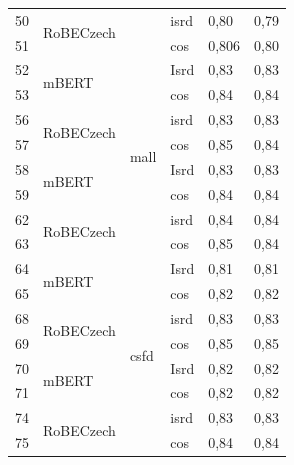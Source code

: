 \begin{table}[]
{\begin{tabular}{|l|l|l|l||ll|}
50 & \multirow{2}{*}{RoBECzech} &                           & isrd                  & 0,80   & 0,79 \\ \cline{1-1} \cline{4-6} 
51 &                            &                           & cos                   & 0,806  & 0,80 \\ \hline
52 & \multirow{2}{*}{mBERT}     & \multirow{8}{*}{mall}     & Isrd                  & 0,83   & 0,83 \\ \cline{1-1} \cline{4-6} 
53 &                            &                           & cos                   & 0,84   & 0,84 \\ \cline{1-2} \cline{4-6} 
56 & \multirow{2}{*}{RoBECzech} &                           & isrd                  & 0,83   & 0,83 \\ \cline{1-1} \cline{4-6} 
57 &                            &                           & cos                   & 0,85   & 0,84 \\ \cline{1-2} \cline{4-6} 
58 & \multirow{2}{*}{mBERT}     &                           & Isrd                  & 0,83   & 0,83 \\ \cline{1-1} \cline{4-6} 
59 &                            &                           & cos                   & 0,84   & 0,84 \\ \cline{1-2} \cline{4-6} 
62 & \multirow{2}{*}{RoBECzech} &                           & isrd                  & 0,84   & 0,84 \\ \cline{1-1} \cline{4-6} 
63 &                            &                           & cos                   & 0,85   & 0,84 \\ \hline
64 & \multirow{2}{*}{mBERT}     & \multirow{8}{*}{csfd}     & Isrd                  & 0,81   & 0,81 \\ \cline{1-1} \cline{4-6} 
65 &                            &                           & cos                   & 0,82   & 0,82 \\ \cline{1-2} \cline{4-6} 
68 & \multirow{2}{*}{RoBECzech} &                           & isrd                  & 0,83   & 0,83 \\ \cline{1-1} \cline{4-6} 
69 &                            &                           & cos                   & 0,85   & 0,85 \\ \cline{1-2} \cline{4-6} 
70 & \multirow{2}{*}{mBERT}     &                           & Isrd                  & 0,82   & 0,82 \\ \cline{1-1} \cline{4-6} 
71 &                            &                           & cos                   & 0,82   & 0,82 \\ \cline{1-2} \cline{4-6} 
74 & \multirow{2}{*}{RoBECzech} &                           & isrd                  & 0,83   & 0,83 \\ \cline{1-1} \cline{4-6} 
75 &                            &                           & cos                   & 0,84   & 0,84 \\ \hline
\end{tabular}}
\end{table}




